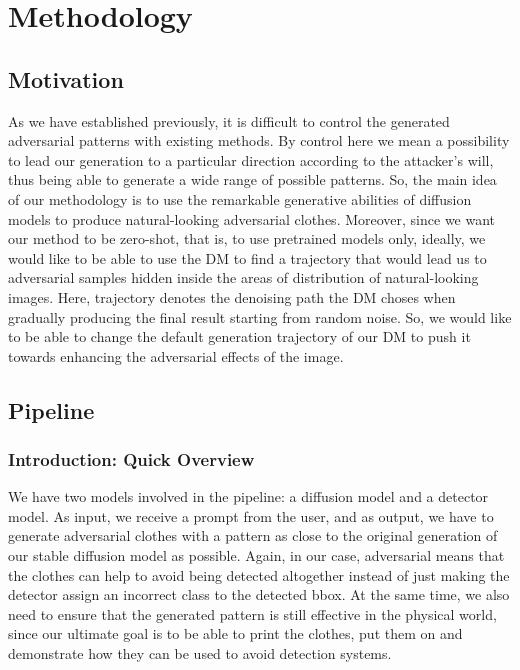 
\chapter{Methodology}

\section{Motivation}

As we have established previously, it is difficult to control the generated adversarial patterns with existing methods. 
By control here we mean a possibility to lead our generation to a particular direction according to the attacker's will, thus being able to generate a wide range of possible patterns.
So, the main idea of our methodology is to use the remarkable generative abilities of diffusion models to produce natural-looking adversarial clothes.
Moreover, since we want our method to be zero-shot, that is, to use pretrained models only, ideally, we would like to be able to use the DM to find a trajectory that would lead us to adversarial samples hidden inside the areas of distribution of natural-looking images.
Here, trajectory denotes the denoising path the DM choses when gradually producing the final result starting from random noise. 
So, we would like to be able to change the default generation trajectory of our DM to push it towards enhancing the adversarial effects of the image.

\section{Pipeline}
\subsection{Introduction: Quick Overview}

We have two models involved in the pipeline: a diffusion model and a detector model.
As input, we receive a prompt from the user, and as output, we have to generate adversarial clothes with a pattern as close to the original generation of our stable diffusion model as possible.
Again, in our case, adversarial means that the clothes can help to avoid being detected altogether instead of just making the detector assign an incorrect class to the detected bbox.
At the same time, we also need to ensure that the generated pattern is still effective in the physical world, since our ultimate goal is to be able to print the clothes, put them on and demonstrate how they can be used to avoid detection systems.

